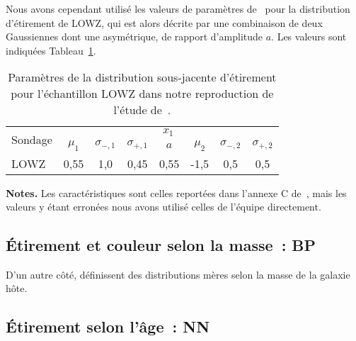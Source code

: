 \documentclass[../main/main.tex]{subfiles}
\begin{document}
Nous avons cependant utilisé les valeurs de paramètres de~\cite{scolnic2018}
pour la distribution d'étirement de LOWZ, qui est alors décrite par une
combinaison de deux Gaussiennes dont une asymétrique, de rapport d'amplitude
$a$. Les valeurs sont indiquées Tableau~\ref{tab:sklowz}.

\begin{table}[ht]
    \centering
    \begin{threeparttable}
        \caption[Paramètres de la distribution d'étirement pour l'échantillon
        LOWZ des simulations SK]{Paramètres de la distribution sous-jacente
            d'étirement pour l'échantillon LOWZ dans notre reproduction de
        l'étude de~.}
        \label{tab:sklowz}
        \begin{tabular}{lccccccc}
            \toprule
            \multirow{2}[2]{*}{Sondage} &
            \multicolumn{7}{c}{$x_1$}\\
            \cmidrule(lr){2-8} &
            $\mu_1$ & $\sigma_{-,1}$ & $\sigma_{+,1}$ &
            $a$ &
            $\mu_2$ & $\sigma_{-,2}$ & $\sigma_{+,2}$ \\
            \midrule
            LOWZ &
            0,55 & 1,0 & 0,45  &
            0,55 &
            -1,5 & 0,5 & 0,5\\
            \bottomrule
        \end{tabular}
        \begin{tablenotes}[flushleft]
        \item\small \textbf{\hspace{-3,2pt}Notes.} Les caractéristiques sont
            celles reportées dans l'annexe C de~\cite{scolnic2018}, mais les
            valeurs y étant erronées nous avons utilisé celles de l'équipe
            directement.
        \end{tablenotes}
    \end{threeparttable}
\end{table}

\subsection{Étirement et couleur selon la masse~: BP}\label{ssec:bp}

D'un autre côté,  définissent des distributions mères
selon la masse de la galaxie hôte.

\subsection{Étirement selon l'âge~: NN}\label{ssec:nn}
\end{document}
